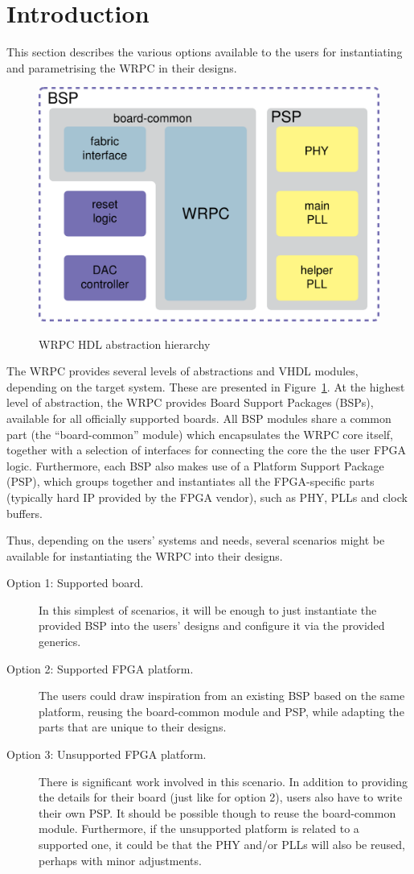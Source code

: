 \section{Introduction}
This section describes the various options available to the users for instantiating and
parametrising the WRPC in their designs.

\begin{figure}
  \begin{center}
    \includegraphics[width=.6\textwidth]{fig/wrpc_board.pdf}
    \label{fig:wrpc_board}
    \caption{WRPC HDL abstraction hierarchy}
  \end{center}
\end{figure}

The WRPC provides several levels of abstractions and VHDL modules, depending on the target
system. These are presented in Figure~\ref{fig:wrpc_board}. At the highest level of abstraction, the
WRPC provides Board Support Packages (BSPs), available for all officially supported boards. All BSP
modules share a common part (the ``board-common'' module) which encapsulates the WRPC core itself,
together with a selection of interfaces for connecting the core the the user FPGA
logic. Furthermore, each BSP also makes use of a Platform Support Package (PSP), which groups
together and instantiates all the FPGA-specific parts (typically hard IP provided by the FPGA
vendor), such as PHY, PLLs and clock buffers.

Thus, depending on the users' systems and needs, several scenarios might be available for
instantiating the WRPC into their designs.

\begin{description}
  \item[Option 1: Supported board.] In this simplest of scenarios, it will be enough to just
    instantiate the provided BSP into the users' designs and configure it via the provided generics.
  \item[Option 2: Supported FPGA platform.] The users could draw inspiration from an existing BSP
    based on the same platform, reusing the board-common module and PSP, while adapting the parts
    that are unique to their designs.
  \item[Option 3: Unsupported FPGA platform.] There is significant work involved in this
    scenario. In addition to providing the details for their board (just like for option 2), users
    also have to write their own PSP. It should be possible though to reuse the board-common
    module. Furthermore, if the unsupported platform is related to a supported one, it could be that
    the PHY and/or PLLs will also be reused, perhaps with minor adjustments.
\end{description}

